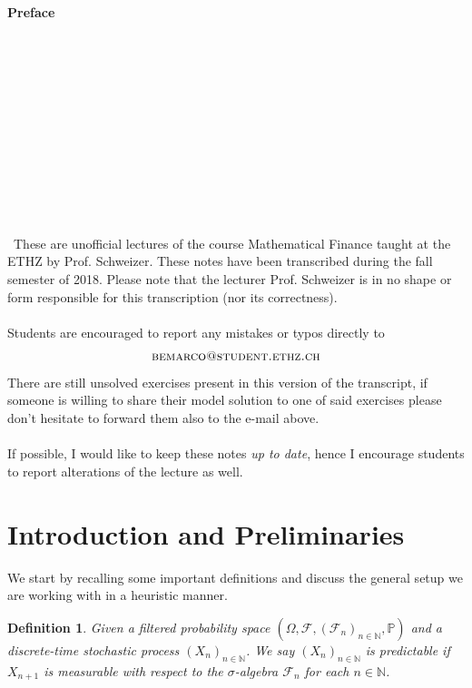 \documentclass[12pt,a4paper, twoside]{article}
\newtheorem{defn}{Definition}[section]
\theoremstyle{definition}
\begin{document}
\newpage
\textbf{\Huge Preface} \\\\\\\\\\\\\\\\\\\\\\\\\\\
These are unofficial lectures of the course Mathematical Finance taught at the ETHZ by Prof. Schweizer. These notes have been transcribed during the fall semester of 2018. Please note that the lecturer Prof. Schweizer is in no shape or form responsible for this transcription (nor its correctness). \\
\\
Students are encouraged to report any mistakes or typos directly to 
\begin{align*}
\textsc{bemarco@student.ethz.ch}
\end{align*}
There are still unsolved exercises present in this version of the transcript, if someone is willing to share their model solution to one of said exercises please don't hesitate to forward them also to the e-mail above. 
\\\\
If possible, I would like to keep these notes \textit{up to date}, hence I encourage students to report alterations of the lecture as well.
\newpage
\tableofcontents
\newpage
\section{Introduction and Preliminaries}
We start by recalling some important definitions and discuss the general setup we are working with in a heuristic manner. 
\begin{defn} Given a filtered probability space $(\Omega, \mathcal{F}, ( \mathcal{F}_n)_{n \in \mathbb{N}}, \mathbb{P})$ and a discrete-time stochastic process $(X_n)_{n \in \mathbb{N}}$. We say $(X_n)_{n \in \mathbb{N}}$ is predictable if $X_{n+1}$ is measurable with respect to the $\sigma$-algebra $\mathcal{F}_n$ for each $n \in \mathbb{N}$. 
\end{defn}
\end{document}
